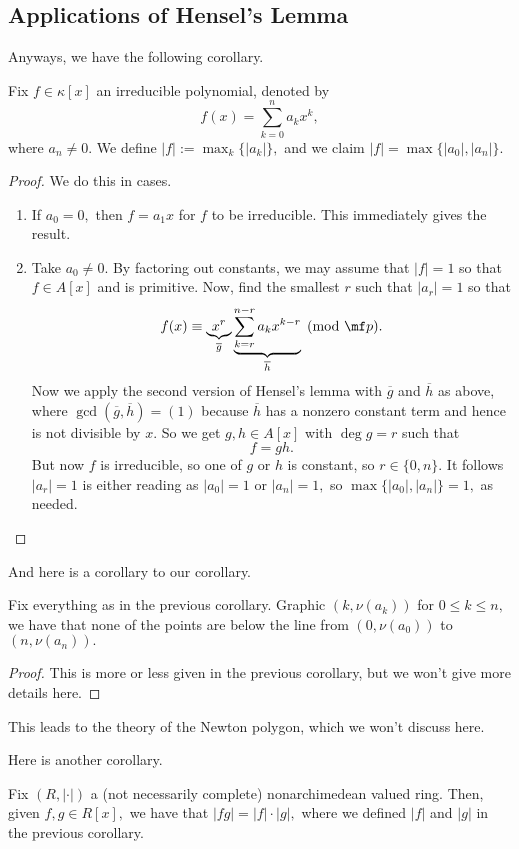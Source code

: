 \documentclass[../notes.tex]{subfiles}
\begin{document}
\subsection{Applications of Hensel's Lemma}
Anyways, we have the following corollary.
\begin{corollary}
	Fix $f\in\kappa[x]$ an irreducible polynomial, denoted by
	\[f(x)=\sum_{k=0}^na_kx^k,\]
	where $a_n\ne0.$ We define $|f|:=\max_k\{|a_k|\},$ and we claim $|f|=\max\{|a_0|,|a_n|\}.$
\end{corollary}
\begin{proof}
	We do this in cases.
	\begin{enumerate}[label=(\roman*)]
		\item If $a_0=0,$ then $f=a_1x$ for $f$ to be irreducible. This immediately gives the result.
		\item Take $a_0\ne0.$ By factoring out constants, we may assume that $|f|=1$ so that $f\in A[x]$ and is primitive. Now, find the smallest $r$ such that $|a_r|=1$ so that
		\[f(x)\equiv \underbrace{x^r}_{\overline g}\underbrace{\sum_{k=r}^{n-r}a_kx^{k-r}}_{\overline h}\pmod{\mf p}.\]
		Now we apply the second version of Hensel's lemma with $\overline g$ and $\overline h$ as above, where $\gcd(\overline g,\overline h)=(1)$ because $\overline h$ has a nonzero constant term and hence is not divisible by $x.$ So we get $g,h\in A[x]$ with $\deg g=r$ such that
		\[f=gh.\]
		But now $f$ is irreducible, so one of $g$ or $h$ is constant, so $r\in\{0,n\}.$ It follows $|a_r|=1$ is either reading as $|a_0|=1$ or $|a_n|=1,$ so $\max\{|a_0|,|a_n|\}=1,$ as needed.
		\qedhere
	\end{enumerate}
\end{proof}
And here is a corollary to our corollary.
\begin{corollary}
	Fix everything as in the previous corollary. Graphic $(k,\nu(a_k))$ for $0\le k\le n,$ we have that none of the points are below the line from $(0,\nu(a_0))$ to $(n,\nu(a_n)).$
\end{corollary}
\begin{proof}
	This is more or less given in the previous corollary, but we won't give more details here.
\end{proof}
\begin{remark}
	This leads to the theory of the Newton polygon, which we won't discuss here.
\end{remark}
Here is another corollary.
\begin{corollary}
	Fix $(R,|\cdot|)$ a (not necessarily complete) nonarchimedean valued ring. Then, given $f,g\in R[x],$ we have that $|fg|=|f|\cdot|g|,$ where we defined $|f|$ and $|g|$ in the previous corollary.
\end{corollary}
\end{document}
